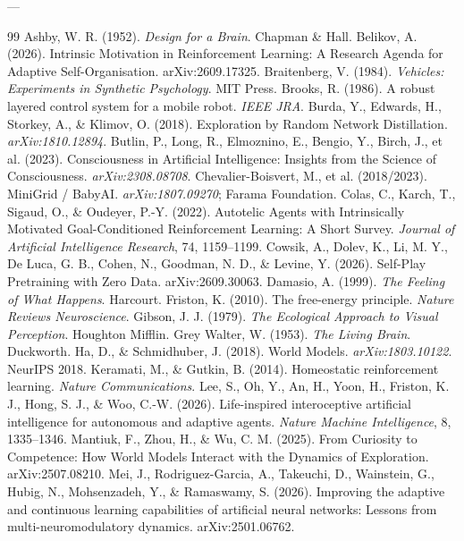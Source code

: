 \documentclass[11pt]{article}
\begin{document}
---

\begin{thebibliography}{99}
Ashby, W. R. (1952). \emph{Design for a Brain}. Chapman \& Hall.
Belikov, A. (2026). Intrinsic Motivation in Reinforcement Learning: A Research Agenda for Adaptive Self-Organisation. arXiv:2609.17325.
Braitenberg, V. (1984). \emph{Vehicles: Experiments in Synthetic Psychology}. MIT Press.
Brooks, R. (1986). A robust layered control system for a mobile robot. \emph{IEEE JRA}.
Burda, Y., Edwards, H., Storkey, A., \& Klimov, O. (2018). Exploration by Random Network Distillation. \emph{arXiv:1810.12894}.
Butlin, P., Long, R., Elmoznino, E., Bengio, Y., Birch, J., et al. (2023). Consciousness in Artificial Intelligence: Insights from the Science of Consciousness. \emph{arXiv:2308.08708}.
Chevalier-Boisvert, M., et al. (2018/2023). MiniGrid / BabyAI. \emph{arXiv:1807.09270}; Farama Foundation.
Colas, C., Karch, T., Sigaud, O., \& Oudeyer, P.-Y. (2022). Autotelic Agents with Intrinsically Motivated Goal-Conditioned Reinforcement Learning: A Short Survey. \emph{Journal of Artificial Intelligence Research}, 74, 1159–1199.
Cowsik, A., Dolev, K., Li, M. Y., De Luca, G. B., Cohen, N., Goodman, N. D., \& Levine, Y. (2026). Self-Play Pretraining with Zero Data. arXiv:2609.30063.
Damasio, A. (1999). \emph{The Feeling of What Happens}. Harcourt.
Friston, K. (2010). The free-energy principle. \emph{Nature Reviews Neuroscience}.
Gibson, J. J. (1979). \emph{The Ecological Approach to Visual Perception}. Houghton Mifflin.
Grey Walter, W. (1953). \emph{The Living Brain}. Duckworth.
Ha, D., \& Schmidhuber, J. (2018). World Models. \emph{arXiv:1803.10122}. NeurIPS 2018.
Keramati, M., \& Gutkin, B. (2014). Homeostatic reinforcement learning. \emph{Nature Communications}.
Lee, S., Oh, Y., An, H., Yoon, H., Friston, K. J., Hong, S. J., \& Woo, C.-W. (2026). Life-inspired interoceptive artificial intelligence for autonomous and adaptive agents. \emph{Nature Machine Intelligence}, 8, 1335–1346.
Mantiuk, F., Zhou, H., \& Wu, C. M. (2025). From Curiosity to Competence: How World Models Interact with the Dynamics of Exploration. arXiv:2507.08210.
Mei, J., Rodriguez-Garcia, A., Takeuchi, D., Wainstein, G., Hubig, N., Mohsenzadeh, Y., \& Ramaswamy, S. (2026). Improving the adaptive and continuous learning capabilities of artificial neural networks: Lessons from multi-neuromodulatory dynamics. arXiv:2501.06762.

\end{thebibliography}
\end{document}

